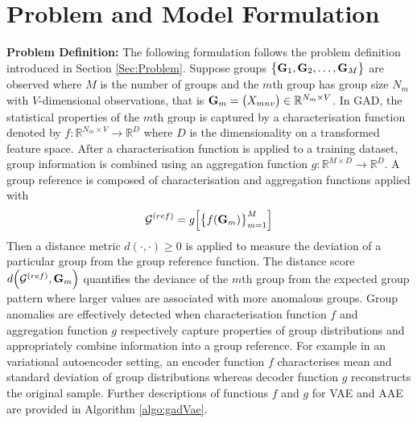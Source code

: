 \section{Problem and Model Formulation} \label{sec:method}
{\bf Problem Definition:} 
{  The following formulation follows the problem definition introduced in %
Section \ref{Sec:Problem}.  
Suppose groups %
$ \big\{  {\bf G}_1, {\bf G}_2,\dots, {\bf G}_M \big\}   $ are observed where $M$ is the number of groups and the $m$th group has group size  
$N_m$ with $V$-dimensional observations, that is 
 ${\bf G}_m = \big( X_{mnv}\big)
 \in \mathbb{R}^{N_m \times V} $. 
} 
 In GAD, the statistical properties of the $m$th group is captured by a characterisation function denoted by $f:  \mathbb{R}^{N_m \times V} \to \mathbb{R}^{D}$ where $D$ is the dimensionality on a transformed feature space. After a characterisation function is applied to a training dataset,  group information is combined using an aggregation function $g: \mathbb{R}^{M \times D} \to \mathbb{R}^{D}$.  A group reference is composed of characterisation and aggregation functions applied with 
\begin{align}
\mathcal{G}^{(ref)} = g \Big[ \big\{ f({\bf G}_{m} ) \big\}_{m=1}^M \Big]
\label{eqn:Gref}
\end{align}
Then a distance metric $d(\cdot,\cdot) \ge 0  $ is applied to measure the deviation of a particular group from the group reference function. The distance score $  d\Big(\mathcal{G}^{(ref)}  , {\bf G}_{m} \Big )$  quantifies the deviance of the $m$th group from the expected group pattern where larger values are associated with more anomalous groups.  
Group anomalies are effectively detected when characterisation function $f$ and aggregation function $g$  respectively capture properties of group distributions and appropriately combine information into a group reference. For example in an variational autoencoder setting, an encoder function $f$ characterises mean and standard deviation  of group distributions whereas {  decoder function $g$ reconstructs the original sample.
 Further descriptions of functions $f$ and $g$ for VAE and AAE are provided in Algorithm \ref{algo:gadVae}.
 }
 
